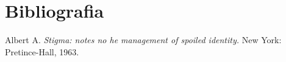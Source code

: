 \section{Bibliografia}
\begin{thebibliography}{H}
	Albert A.
	\textit{Stigma: notes no he management of spoiled identity.}
	New York: Pretince-Hall, 1963.
	
\end{thebibliography}